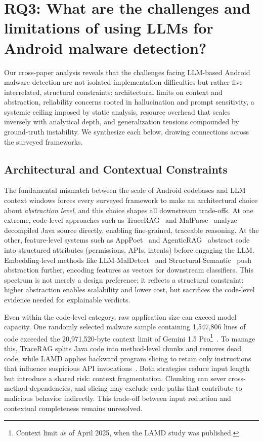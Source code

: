 \section{RQ3: What are the challenges and limitations of using
LLMs for Android malware detection?}\label{sec:rq3}

Our cross-paper analysis reveals that the challenges facing LLM-based Android malware detection are not isolated implementation difficulties but rather five interrelated, structural constraints: architectural limits on context and abstraction, reliability concerns rooted in hallucination and prompt sensitivity, a systemic ceiling imposed by static analysis, resource overhead that scales inversely with analytical depth, and generalization tensions compounded by ground-truth instability. We synthesize each below, drawing connections across the surveyed frameworks.

\subsection{Architectural and Contextual Constraints}

The fundamental mismatch between the scale of Android codebases and LLM context windows forces every surveyed framework to make an architectural choice about \textit{abstraction level}, and this choice shapes all downstream trade-offs. At one extreme, code-level approaches such as TraceRAG~\cite{Zhang2025-ot} and MalParse~\cite{Walton2025-qi} analyze decompiled Java source directly, enabling fine-grained, traceable reasoning. At the other, feature-level systems such as AppPoet~\cite{Zhao2024-dw} and AgenticRAG~\cite{S2025-kj} abstract code into structured attributes (permissions, APIs, intents) before engaging the LLM. Embedding-level methods like LLM-MalDetect~\cite{Feng2025-ry} and Structural-Semantic~\cite{Khan2024-hy} push abstraction further, encoding features as vectors for downstream classifiers. This spectrum is not merely a design preference; it reflects a structural constraint: higher abstraction enables scalability and lower cost, but sacrifices the code-level evidence needed for explainable verdicts.

Even within the code-level category, raw application size can exceed model capacity. One randomly selected malware sample containing 1,547,806 lines of code exceeded the 20,971,520-byte context limit of Gemini 1.5 Pro\footnote{Context limit as of April 2025, when the LAMD study was published.}~\cite{Qian2025-ua}. To manage this, TraceRAG splits Java code into method-level chunks and removes dead code, while LAMD applies backward program slicing to retain only instructions that influence suspicious API invocations~\cite{Qian2025-ua}. Both strategies reduce input length but introduce a shared risk: context fragmentation. Chunking can sever cross-method dependencies, and slicing may exclude code paths that contribute to malicious behavior indirectly. This trade-off between input reduction and contextual completeness remains unresolved.

